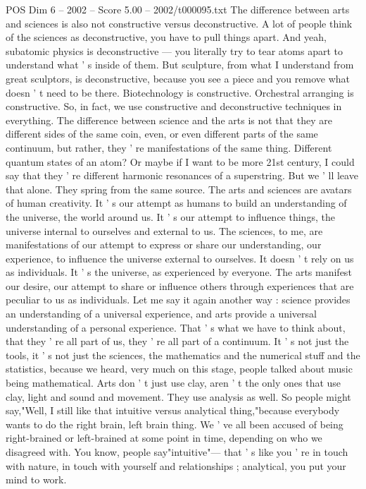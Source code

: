 \begin{textsample}{POS Dim 6 – 2002 – Score 5.00 – 2002/t000095.txt}
The difference between arts and sciences is also not constructive versus deconstructive.
A lot of people think of the sciences as deconstructive, you have to pull things apart.
And yeah, subatomic physics is deconstructive — you literally try to tear atoms apart to understand what ' s inside of them.
But sculpture, from what I understand from great sculptors, is deconstructive, because you see a piece and you remove what doesn ' t need to be there.
Biotechnology is constructive.
Orchestral arranging is constructive.
So, in fact, we use constructive and deconstructive techniques in everything.
The difference between science and the arts is not that they are different sides of the same coin, even, or even different parts of the same continuum, but rather, they ' re manifestations of the same thing.
Different quantum states of an atom?
Or maybe if I want to be more 21st century, I could say that they ' re different harmonic resonances of a superstring.
But we ' ll leave that alone.
They spring from the same source.
The arts and sciences are avatars of human creativity.
It ' s our attempt as humans to build an understanding of the universe, the world around us.
It ' s our attempt to influence things, the universe internal to ourselves and external to us.
The sciences, to me, are manifestations of our attempt to express or share our understanding, our experience, to influence the universe external to ourselves.
It doesn ' t rely on us as individuals.
It ' s the universe, as experienced by everyone.
The arts manifest our desire, our attempt to share or influence others through experiences that are peculiar to us as individuals.
Let me say it again another way : science provides an understanding of a universal experience, and arts provide a universal understanding of a personal experience.
That ' s what we have to think about, that they ' re all part of us, they ' re all part of a continuum.
It ' s not just the tools, it ' s not just the sciences, the mathematics and the numerical stuff and the statistics, because we heard, very much on this stage, people talked about music being mathematical.
Arts don ' t just use clay, aren ' t the only ones that use clay, light and sound and movement.
They use analysis as well.
So people might say,"Well, I still like that intuitive versus analytical thing,"because everybody wants to do the right brain, left brain thing.
We ' ve all been accused of being right-brained or left-brained at some point in time, depending on who we disagreed with.
You know, people say"intuitive"— that ' s like you ' re in touch with nature, in touch with yourself and relationships ; analytical, you put your mind to work.

\end{textsample}
